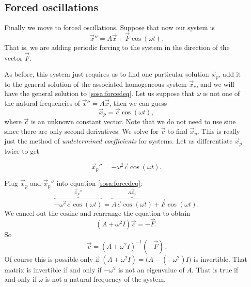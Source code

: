 \documentclass{ximera}
\begin{document}
\subsection{Forced oscillations}

Finally we move to forced oscillations. Suppose that now our system is
\begin{equation} \label{sosa:forcedeq}
    {\vec{x}}'' = A \vec{x} + \vec{F} \cos ( \omega t) .
\end{equation}
That is, we are adding periodic forcing to the system in the direction of the vector $\vec{F}$.

As before, this system just requires us to find one particular solution $\vec{x}_p$, add it to the general solution of the associated homogeneous system $\vec{x}_c$, and we will have the general solution to \eqref{sosa:forcedeq}. Let us suppose that $\omega$ is not one of the natural frequencies of ${\vec{x}}'' = A \vec{x}$, then we can guess
\begin{equation*}
    \vec{x}_p = \vec{c} \cos (\omega t) ,
\end{equation*}
where $\vec{c}$ is an unknown constant vector.  Note that we do not need to use sine since there are only second derivatives. We solve for $\vec{c}$ to find $\vec{x}_p$.  This is really just the method of \emph{undetermined coefficients} for systems.  Let us differentiate $\vec{x}_p$ twice to get

\begin{equation*}
    {\vec{x}_p}'' = -\omega^2 \vec{c} \cos (\omega t) .
\end{equation*}

Plug $\vec{x}_p$ and ${\vec{x}_p}''$ into equation \eqref{sosa:forcedeq}:
\begin{equation*}
    \overbrace{ -\omega^2 \vec{c} \cos (\omega t)}^{{\vec{x}_p}''} = \overbrace{ A \vec{c} \cos (\omega t) }^{A \vec{x}_p} + \vec{F} \cos (\omega t) .
\end{equation*}
We cancel out the cosine and rearrange the equation to obtain
\begin{equation*}
    (A +\omega^2 I) \vec{c} = - \vec{F} .
\end{equation*}
So
\begin{equation*}
    \vec{c} = {(A +\omega^2 I)}^{-1} (-\vec{F} ).
\end{equation*}
Of course this is possible only if $(A+ \omega^2 I) = \bigl(A- (-\omega^2) I\bigr)$ is invertible.  That matrix is invertible if and only if $-\omega^2$ is not an eigenvalue of $A$.  That is true if and only if $\omega$ is not a natural frequency of the system.
\end{document}
